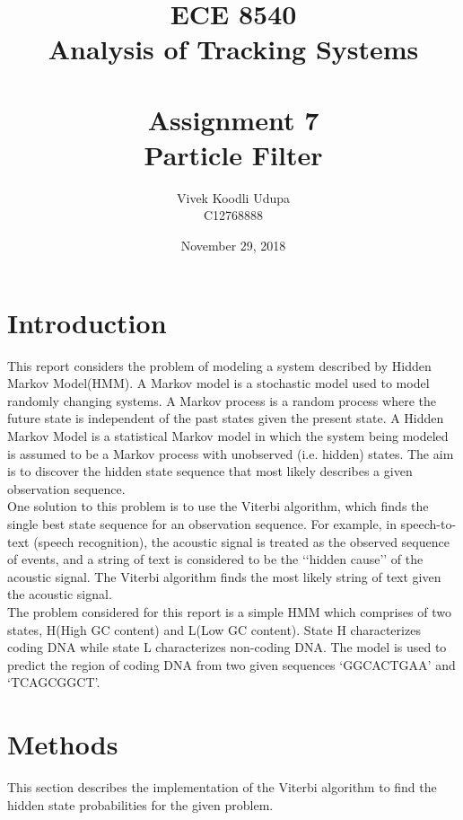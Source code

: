 \documentclass[12pt]{article}
\title{ECE 8540 \\ Analysis of Tracking Systems \\ \quad \\
	Assignment 7 \\ Particle Filter}
\author{Vivek Koodli Udupa \\ C12768888}
\date{November 29, 2018 }
\begin{document}
\begin{mdframed}
\maketitle
\end{mdframed}


\section{Introduction}
This report considers the problem of modeling a system described by Hidden Markov Model(HMM). A Markov model is a stochastic model used to model randomly changing systems. A Markov process is a random process where the future state is independent of the past states given the present state. A Hidden Markov Model is a statistical Markov model in which the system being modeled is assumed to be a Markov process with unobserved (i.e. hidden) states. The aim is to discover the hidden state
sequence that most likely describes a given observation sequence. \\

One solution to this problem is to use the Viterbi algorithm, which finds the single best state sequence for an observation sequence. For example, in speech-to-text (speech recognition), the acoustic signal is treated as the observed sequence of events, and a string of text is considered to be the \lq\lq{hidden cause}\rq\rq{} of the acoustic signal. The Viterbi algorithm finds the most likely string of text given the acoustic signal.  \\

The problem considered for this report is a simple HMM which comprises of two states, H(High GC content) and L(Low GC content). State H characterizes coding DNA while state L characterizes non-coding DNA. The model is used to predict the region of coding DNA from two given sequences \lq{GGCACTGAA}\rq{} and \lq{TCAGCGGCT}\rq{}.

\section{Methods}
This section describes the implementation of the Viterbi algorithm to find the hidden state probabilities for the given problem.
\end{document}
